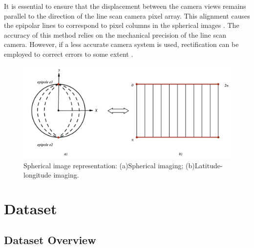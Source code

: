 \documentclass[english, LaM, oneside]{sapthesis}%
\begin{document}
It is essential to ensure that the displacement between the camera views remains parallel to the direction of the line scan camera pixel array. This alignment causes the epipolar lines to correspond to pixel columns in the spherical images \cite{f3}. The accuracy of this method relies on the mechanical precision of the line scan camera. However, if a less accurate camera system is used, rectification can be employed to correct errors to some extent \cite{f2}.


\begin{figure}[h]
    \centering
    \includegraphics[width=\linewidth]{Images/cy1.png}
    \caption{Spherical image representation: (a)Spherical imaging; (b)Latitude-longitude imaging.}
    \label{fig:cy}
\end{figure}

\chapter{Dataset}
\label{chap:2}
\section{Dataset Overview}
\end{document}
